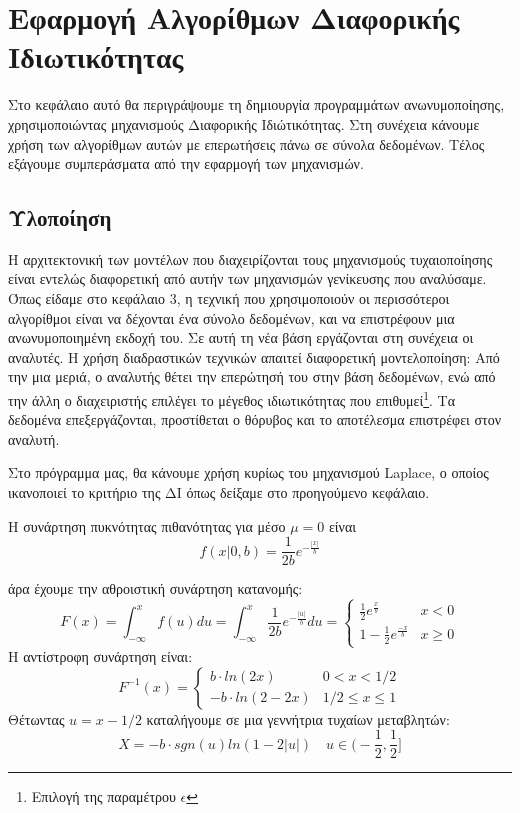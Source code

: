 \chapter{Εφαρμογή Αλγορίθμων Διαφορικής Ιδιωτικότητας}


Στο κεφάλαιο αυτό θα περιγράψουμε τη δημιουργία προγραμμάτων ανωνυμοποίησης, χρησιμοποιώντας μηχανισμούς Διαφορικής Ιδιώτικότητας. Στη συνέχεια κάνουμε χρήση των αλγορίθμων αυτών με επερωτήσεις πάνω σε σύνολα δεδομένων. Τέλος εξάγουμε συμπεράσματα από την εφαρμογή των μηχανισμών. 

\section{Υλοποίηση}

 Η αρχιτεκτονική των μοντέλων που διαχειρίζονται τους μηχανισμούς τυχαιοποίησης είναι εντελώς διαφορετική από αυτήν των μηχανισμών γενίκευσης που αναλύσαμε. Όπως είδαμε στο κεφάλαιο 3, η τεχνική που χρησιμοποιούν οι περισσότεροι αλγορίθμοι είναι να δέχονται ένα σύνολο δεδομένων, και να επιστρέφουν μια ανωνυμοποιημένη εκδοχή του. Σε αυτή τη νέα βάση εργάζονται στη συνέχεια οι αναλυτές. Η χρήση διαδραστικών τεχνικών απαιτεί διαφορετική μοντελοποίηση: Από την μια μεριά, ο αναλυτής θέτει την επερώτησή του στην βάση δεδομένων, ενώ από την άλλη ο διαχειριστής επιλέγει το μέγεθος ιδιωτικότητας που επιθυμεί\footnote{Επιλογή της παραμέτρου $\epsilon$}. Τα δεδομένα επεξεργάζονται, προστίθεται ο θόρυβος και το αποτέλεσμα επιστρέφει στον αναλυτή.

Στο πρόγραμμα μας, θα κάνουμε χρήση κυρίως του μηχανισμού \textlatin{Laplace}, ο οποίος ικανοποιεί το κριτήριο της ΔΙ όπως δείξαμε στο προηγούμενο κεφάλαιο. 

Η συνάρτηση πυκνότητας πιθανότητας για μέσο $\mu=0$ είναι 
$$f(x|0,b)=\frac{1}{2b}e^{-\frac{|x|}{b}}$$

άρα έχουμε την αθροιστική συνάρτηση κατανομής:
$$F(x)=
\int_{-\infty}^{x} f(u)du=
\int_{-\infty}^{x} \frac{1}{2b}e^{-\frac{|u|}{b}}du=
 \begin{cases} 
      \frac{1}{2}e^{\frac{x}{b}} & x< 0 \\
      1-\frac{1}{2}e^{\frac{-x}{b}} & x\geq 0 
   \end{cases}$$
Η αντίστροφη συνάρτηση είναι:
$$F^{-1}(x)=
\begin{cases} 
      b\cdot ln(2x) & 0<x<1/2 \\
      -b\cdot ln(2-2x) & 1/2 \leq x \leq 1
   \end{cases}$$
 Θέτωντας $u=x-1/2$ καταλήγουμε σε μια γεννήτρια τυχαίων μεταβλητών:
$$X=-b\cdot sgn(u)ln(1-2|u|) \quad u\in \Big(-\frac{1}{2}, \frac{1}{2}\Big]$$

